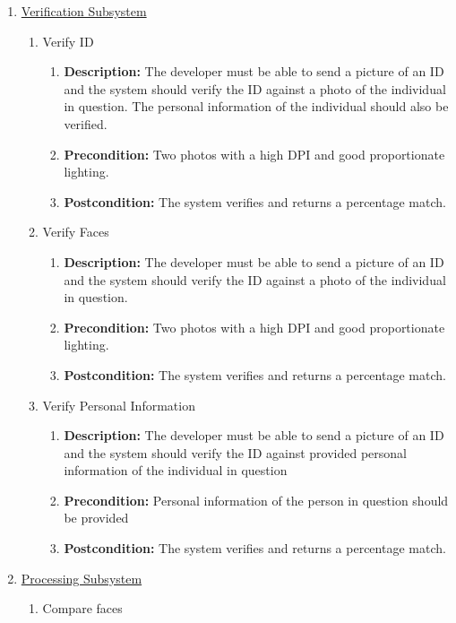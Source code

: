 \documentclass{article}
\begin{document}
		\begin{enumerate}
			\item \underline{Verification Subsystem}
			\begin{enumerate}
				\item Verify ID
				\begin{enumerate}
					\item \textbf{Description:} The developer must be able to send a picture of an ID and the system should verify the ID against a photo of the individual in question. The personal information of the individual should also be verified.
					\item \textbf{Precondition:} Two photos with a high DPI and good proportionate lighting.
					\item \textbf{Postcondition:} The system verifies and returns a percentage match.
				\end{enumerate}
				\item Verify Faces
				\begin{enumerate}
					\item \textbf{Description:} The developer must be able to send a picture of an ID and the system should verify the ID against a photo of the individual in question.
					\item \textbf{Precondition:} Two photos with a high DPI and good proportionate lighting.
					\item \textbf{Postcondition:} The system verifies and returns a percentage match.
				\end{enumerate}
				\item Verify Personal Information
				\begin{enumerate}
					\item \textbf{Description:} The developer must be able to send a picture of an ID and the system should verify the ID against provided personal information of the individual in question
					\item \textbf{Precondition:} Personal information of the person in question should be provided
					\item \textbf{Postcondition:} The system verifies and returns a percentage match.
				\end{enumerate}
			\end{enumerate}
			\item \underline{Processing Subsystem}
			\begin{enumerate}
				\item Compare faces
				\begin{enumerate}

\end{enumerate}
\end{enumerate}
\end{enumerate}
\end{document}
